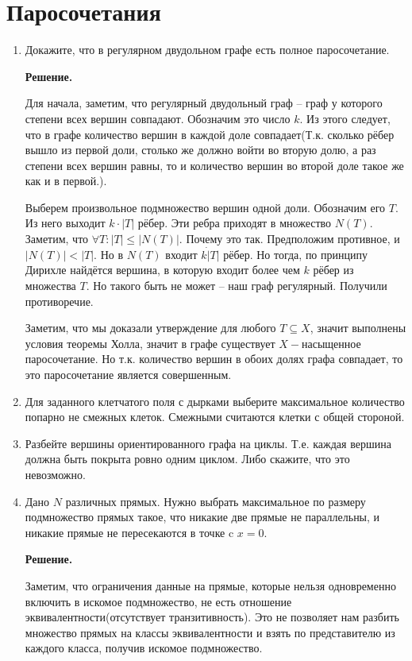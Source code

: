 \section*{Паросочетания}
\begin{enumerate}
	\item Докажите, что в регулярном двудольном графе есть полное паросочетание.
	
	\textbf{Решение.} 
	
	Для начала, заметим, что регулярный двудольный граф -- граф у которого степени всех вершин совпадают. Обозначим 
	это число $k$. Из этого следует, что в графе количество вершин в каждой доле совпадает(Т.к. сколько рёбер вышло 
	из первой доли, столько же должно войти во вторую долю, а раз степени всех вершин равны, то и количество 
	вершин во второй доле такое же как и в первой.).
	
	Выберем произвольное подмножество вершин одной доли. Обозначим его $T$. Из него выходит $k \cdot |T|$ рёбер.
	Эти ребра приходят в множество $N(T)$. Заметим, что $\forall T: |T|\leqslant |N(T)|$. Почему это так. 
	Предположим противное, и $|N(T)| < |T|$. Но в $N(T)$ входит $k \dot |T|$ рёбер. Но тогда, по принципу Дирихле 
	найдётся вершина, в которую входит более чем $k$ рёбер из множества $T$. Но такого быть не может -- наш 
	граф регулярный. Получили противоречие. 
	
	Заметим, что мы доказали утверждение для любого $T \subseteq X$, значит выполнены условия теоремы Холла, 
	значит в графе существует $X-$насыщенное паросочетание. Но т.к. количество вершин в обоих долях графа 
	совпадает, то это паросочетание является совершенным.
	
	\item Для заданного клетчатого поля с дырками выберите максимальное количество попарно не смежных клеток. 
	Смежными считаются клетки с общей стороной.
	\item Разбейте вершины ориентированного графа на циклы. Т.е. каждая вершина должна быть покрыта ровно одним 
	циклом. Либо скажите, что это невозможно.
	\item Дано $N$ различных прямых. Нужно выбрать максимальное по размеру подмножество прямых такое, что никакие 
	две прямые не параллельны, и никакие прямые не пересекаются в точке c $x = 0$.
	
	\textbf{Решение.}
	
	Заметим, что ограничения данные на прямые, которые нельзя одновременно включить в искомое подмножество, не 
	есть отношение эквивалентности(отсутствует транзитивность). Это не позволяет нам разбить множество прямых 
	на классы эквивалентности и взять по представителю из каждого класса, получив искомое подмножество. 
	

\end{enumerate}

